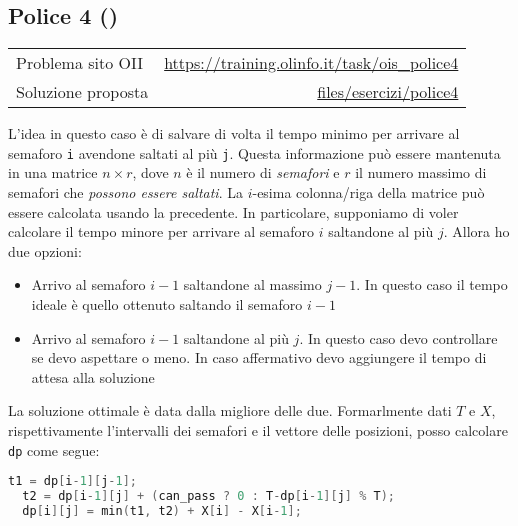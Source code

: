 \subsection{Police 4 {()}}
\label{sol police4}
\begin{center}
	\begin{tabularx}{\textwidth}{X r}
		\toprule
		Problema sito OII  & \url{https://training.olinfo.it/task/ois_police4}                     \\
		Soluzione proposta & \ttfamily\href{run:./files/esercizi/police4/}{files/esercizi/police4} \\
		\bottomrule
	\end{tabularx}
\end{center}
L'idea in questo caso è di salvare di volta il tempo minimo per arrivare al semaforo \verb|i| avendone saltati al più \verb|j|. Questa informazione può essere mantenuta in una matrice $ n \times r $, dove $ n $ è il numero di \textit{semafori} e $ r $ il numero massimo di semafori che \textit{possono essere saltati}.
\vskip3mm
La $ i $-esima colonna/riga della matrice può essere calcolata usando la precedente. In particolare, supponiamo di voler calcolare il tempo minore per arrivare al semaforo $ i $ saltandone al più $ j $. Allora ho due opzioni:
\begin{itemize}
	\item Arrivo al semaforo $ i-1 $ saltandone al massimo $ j-1 $. In questo caso il tempo ideale è quello ottenuto saltando il semaforo $ i-1 $
	\item Arrivo al semaforo $ i-1 $ saltandone al più $ j $. In questo caso devo controllare se devo aspettare o meno. In caso affermativo devo aggiungere il tempo di attesa alla soluzione
\end{itemize}
La soluzione ottimale è data dalla migliore delle due. Formarlmente dati $ T $ e $ X $, rispettivamente l'intervalli dei semafori e il vettore delle posizioni, posso calcolare \verb|dp| come segue:
\begin{center}
	\begin{lstlisting}[language = cpp, frame = none]
  t1 = dp[i-1][j-1];
  t2 = dp[i-1][j] + (can_pass ? 0 : T-dp[i-1][j] % T);
  dp[i][j] = min(t1, t2) + X[i] - X[i-1];
\end{lstlisting}
\end{center}
\begin{center}
	\ttfamily
\end{center}

